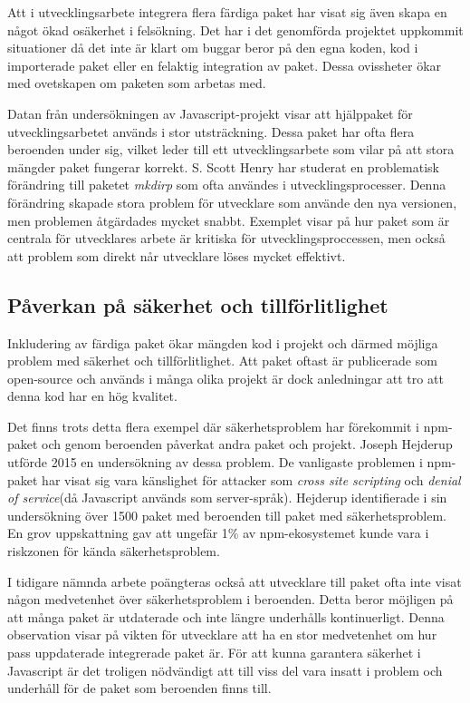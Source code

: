 Att i utvecklingsarbete integrera flera färdiga paket har visat sig även skapa en något ökad osäkerhet i felsökning. Det har i det genomförda projektet uppkommit situationer då det inte är klart om buggar beror på den egna koden, kod i importerade paket eller en felaktig integration av paket. Dessa ovissheter ökar med ovetskapen om paketen som arbetas med.

Datan från undersökningen av Javascript-projekt visar att hjälppaket för utvecklingsarbetet används i stor utsträckning. Dessa paket har ofta flera beroenden under sig, vilket leder till ett utvecklingsarbete som vilar på att stora mängder paket fungerar korrekt. S. Scott Henry har studerat en problematisk förändring till paketet \textit{mkdirp} som ofta användes i utvecklingsprocesser.\cite{Henry2017} Denna förändring skapade stora problem för utvecklare som använde den nya versionen, men problemen åtgärdades mycket snabbt. Exemplet visar på hur paket som är centrala för utvecklares arbete är kritiska för utvecklingsproccessen, men också att problem som direkt når utvecklare löses mycket effektivt.

\subsection{Påverkan på säkerhet och tillförlitlighet}
Inkludering av färdiga paket ökar mängden kod i projekt och därmed möjliga problem med säkerhet och tillförlitlighet. Att paket oftast är publicerade som open-source och används i många olika projekt är dock anledningar att tro att denna kod har en hög kvalitet.\cite{coverity-scan2013}

Det finns trots detta flera exempel där säkerhetsproblem har förekommit i npm-paket och genom beroenden påverkat andra paket och projekt. Joseph Hejderup utförde 2015 en undersökning av dessa problem.\cite{Hejderup2017} De vanligaste problemen i npm-paket har visat sig vara känslighet för attacker som \textit{cross site scripting} och \textit{denial of service}(då Javascript används som server-språk). Hejderup identifierade i sin undersökning över 1500 paket med beroenden till paket med säkerhetsproblem. En grov uppskattning gav att ungefär 1\% av npm-ekosystemet kunde vara i riskzonen för kända säkerhetsproblem.

I tidigare nämnda arbete poängteras också att utvecklare till paket ofta inte visat någon medvetenhet över säkerhetsproblem i beroenden. Detta beror möjligen på att många paket är utdaterade och inte längre underhålls kontinuerligt. Denna observation visar på vikten för utvecklare att ha en stor medvetenhet om hur pass uppdaterade integrerade paket är. För att kunna garantera säkerhet i Javascript är det troligen nödvändigt att till viss del vara insatt i problem och underhåll för de paket som beroenden finns till.


